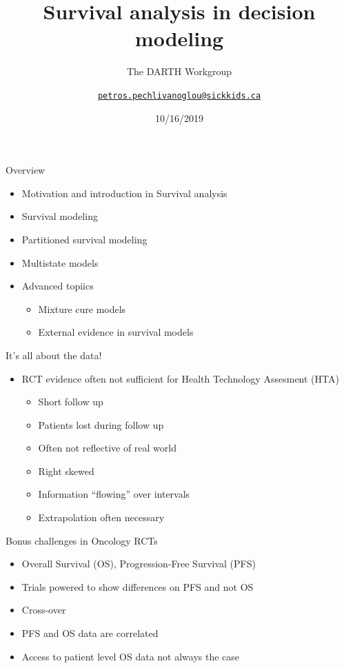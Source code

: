 \documentclass[
  ignorenonframetext,
]{beamer}
\title{Survival analysis in decision modeling}
\subtitle{The DARTH Workgroup}
\author{\href{mailto:petros.pechlivanoglou@sickkids.ca}{\nolinkurl{petros.pechlivanoglou@sickkids.ca}}}
\date{10/16/2019}
\providecommand{\tightlist}{%
  \setlength{\itemsep}{0pt}\setlength{\parskip}{0pt}}
\begin{document}
\frame{\titlepage}

\begin{frame}{Overview}
\protect\hypertarget{overview}{}

\begin{itemize}
\tightlist
\item
  Motivation and introduction in Survival analysis
\item
  Survival modeling
\item
  Partitioned survival modeling
\item
  Multistate models
\item
  Advanced topiics

  \begin{itemize}
  \tightlist
  \item
    Mixture cure models
  \item
    External evidence in survival models
  \end{itemize}
\end{itemize}

\end{frame}

\begin{frame}{It's all about the data!}
\protect\hypertarget{its-all-about-the-data}{}

\begin{itemize}
\tightlist
\item
  RCT evidence often not sufficient for Health Technology Assesment
  (HTA)

  \begin{itemize}
  \tightlist
  \item
    Short follow up
  \item
    Patients lost during follow up
  \item
    Often not reflective of real world
  \item
    Right skewed\\
  \item
    Information ``flowing'' over intervals
  \item
    Extrapolation often necessary
  \end{itemize}
\end{itemize}

\end{frame}

\begin{frame}{Bonus challenges in Oncology RCTs}
\protect\hypertarget{bonus-challenges-in-oncology-rcts}{}

\begin{itemize}
\tightlist
\item
  Overall Survival (OS), Progression-Free Survival (PFS)
\item
  Trials powered to show differences on PFS and not OS
\item
  Cross-over
\item
  PFS and OS data are correlated
\item
  Access to patient level OS data not always the case
\end{itemize}

\end{frame}
\end{document}
